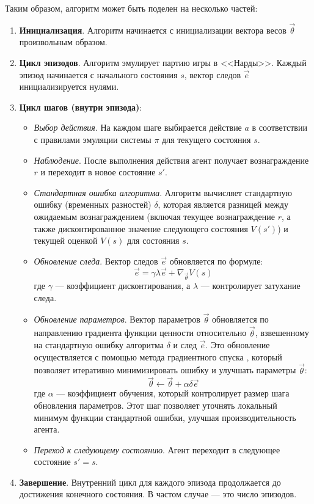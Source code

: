 Таким образом, алгоритм может быть поделен на несколько частей:

\begin{enumerate}
    \item \textbf{Инициализация}. Алгоритм начинается с инициализации вектора весов $\vec{\theta}$ произвольным образом.
    \item \textbf{Цикл эпизодов}. Алгоритм эмулирует партию игры в <<Нарды>>. Каждый эпизод начинается с начального состояния $s$, вектор следов $\vec{e}$ инициализируется нулями.
    \item \textbf{Цикл шагов (внутри эпизода)}:
    \begin{itemize}
        \item \textit{Выбор действия}. На каждом шаге выбирается действие $a$ в соответствии с правилами эмуляции системы $\pi$ для текущего состояния $s$.
        \item \textit{Наблюдение}. После выполнения действия агент получает вознаграждение $r$ и переходит в новое состояние $s'$.
        \item \textit{Стандартная ошибка алгоритма}. Алгоритм вычисляет стандартную ошибку (временных разностей) $\delta$, которая является разницей между ожидаемым вознаграждением (включая текущее вознаграждение $r$, а также дисконтированное значение следующего состояния $V(s')$) и текущей оценкой $V(s)$ для состояния $s$.
        \item \textit{Обновление следа}. Вектор следов $\vec{e}$ обновляется по формуле:
        \begin{equation}
            \vec{e} = \gamma \lambda \vec{e} + \nabla_{\vec{\theta}} V(s)
        \end{equation}
        где $\gamma$ --- коэффициент дисконтирования, а $\lambda$ --- контролирует затухание следа.
        \item \textit{Обновление параметров}. Вектор параметров $\vec{\theta}$ обновляется по направлению градиента функции ценности относительно $\vec{\theta}$, взвешенному на стандартную ошибку алгоритма $\delta$ и след $\vec{e}$. Это обновление осуществляется с помощью метода градиентного спуска \cite{gradient-descent}, который позволяет итеративно минимизировать ошибку и улучшать параметры $\vec{\theta}$:
        \begin{equation}
            \vec{\theta} \gets \vec{\theta} + \alpha \delta \vec{e}
        \end{equation}
        где $\alpha$ — коэффициент обучения, который контролирует размер шага обновления параметров. Этот шаг позволяет уточнять локальный минимум функции стандартной ошибки, улучшая производительность агента.
        \item \textit{Переход к следующему состоянию}. Агент переходит в следующее состояние $s' = s$.
    \end{itemize}
    \item \textbf{Завершение}. Внутренний цикл для каждого эпизода продолжается до достижения конечного состояния. В частом случае --- это число эпизодов.
\end{enumerate}

